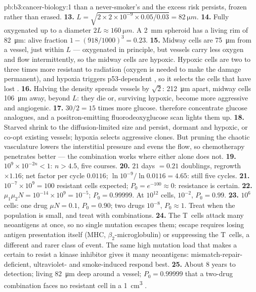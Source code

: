 \begin{solution}{pb:b3:cancer-biology:1}
 than a never-smoker's and the excess risk persists, frozen
rather than erased.
\textbf{13.} $L = \sqrt{2\times 2\times 10^{-9}\times 0.05/0.03} =
\qty{82}{\micro m}$.
\textbf{14.} Fully oxygenated up to a diameter $2L \approx
\qty{160}{\micro m}$. A \qty{2}{mm} spheroid has a living rim of
\qty{82}{\micro m}: alive fraction $1 - (918/1000)^{3} = 0.23$.
\textbf{15.} Midway cells are \qty{75}{\micro m} from a vessel, just
within $L$ --- oxygenated in principle, but  vessels carry less
oxygen and flow intermittently, so the midway cells are hypoxic.
Hypoxic cells are two to three times more resistant to radiation
(oxygen is needed to make the damage permanent), and hypoxia triggers
p53-dependent , so it selects the cells that have lost .
\textbf{16.} Halving the density spreads vessels by $\sqrt{2}$:
\qty{212}{\micro m} apart, midway cells \qty{106}{\micro m} away, beyond
$L$: they die or, surviving hypoxic, become more aggressive and
angiogenic.
\textbf{17.} $30/2 = 15$ times more glucose.  therefore
concentrate glucose analogues, and a positron-emitting
fluorodeoxyglucose scan lights them up.
\textbf{18.} Starved  shrink to the diffusion-limited size and
persist, dormant and hypoxic, or co-opt existing vessels; hypoxia
selects aggressive clones. But pruning the chaotic  vasculature
lowers the interstitial pressure and evens the flow, so chemotherapy
penetrates better --- the combination works where either alone does
not.
\textbf{19.} $10^{9}\times 10^{-2n} < 1$: $n > 4.5$, five courses.
\textbf{20.} $21$ days $= 0.21$ doublings, regrowth $\times 1.16$; net
factor per cycle $0.0116$; $\ln 10^{-9}/\ln 0.0116 = 4.65$: still five
cycles.
\textbf{21.} $10^{-7}\times 10^{9} = 100$ resistant cells expected;
$P_{0} = e^{-100} \approx 0$: resistance is certain.
\textbf{22.} $\mu_{1}\mu_{2}N = 10^{-14}\times 10^{9} = 10^{-5}$;
$P_{0} = 0.99999$. At $10^{12}$ cells, $10^{-2}$, $P_{0} = 0.99$.
\textbf{23.} $10^{6}$ cells: one drug $\mu N = 0.1$, $P_{0} = 0.90$; two
drugs $10^{-8}$, $P_{0} \approx 1$. Treat when the population is small,
and treat with combinations.
\textbf{24.} The T~cells attack many neoantigens at once, so no single
mutation escapes them; escape requires losing antigen presentation
itself (MHC, $\beta_{2}$-microglobulin) or suppressing the T~cells, a
different and rarer class of event. The same high mutation load that
makes a  certain to resist a kinase inhibitor gives it many
neoantigens: mismatch-repair-deficient, ultraviolet- and smoke-induced
 respond best.
\textbf{25.} About $8$ years to detection; living  \qty{82}{\micro m}
deep around a vessel; $P_{0} = 0.99999$ that a two-drug combination
faces no resistant cell in a \qty{1}{cm^3} .
\end{solution}
